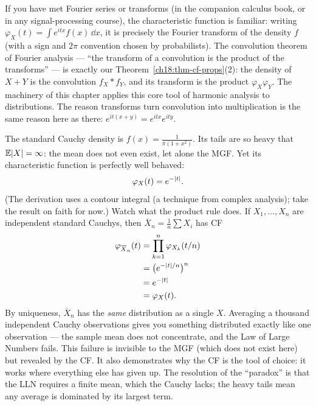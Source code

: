 \begin{connectionbox}
If you have met Fourier series or transforms (in the companion calculus book, or
in any signal-processing course), the characteristic function is familiar:
writing $\varphi_X(t)=\int e^{itx}f(x)\,\dd x$, it is precisely the
Fourier transform of the density $f$ (with a sign and $2\pi$ convention chosen
by probabilists). The convolution theorem of Fourier analysis --- ``the
transform of a convolution is the product of the transforms'' --- is exactly our
Theorem~\ref{ch18:thm-cf-props}(2): the density of $X+Y$ is the convolution
$f_X * f_Y$, and its transform is the product $\varphi_X\varphi_Y$. The
machinery of this chapter applies this core tool of
harmonic analysis to distributions. The reason transforms turn convolution into multiplication
is the same reason here as there: $e^{it(x+y)}=e^{itx}e^{ity}$.
\end{connectionbox}

\begin{paradoxbox}
\label{ch18:ex-cauchy}
The standard Cauchy density is $f(x)=\frac{1}{\pi(1+x^2)}$. Its tails are so
heavy that $\operatorname{\mathbb{E}}\lvert X\rvert=\infty$: the mean does not even exist, let alone the MGF.
Yet its characteristic function is perfectly well behaved:
\[
  \varphi_X(t) = e^{-\lvert t\rvert} .
\]
(The derivation uses a contour integral (a technique from complex analysis); take the result on faith for now.) Watch
what the product rule does. If $X_1,\dots,X_n$ are independent standard Cauchys,
then $\overline{X}_n=\frac1n\sum X_i$ has CF
\begin{align*}
  \varphi_{\overline X_n}(t)
   &= \prod_{k=1}^n \varphi_{X_k}(t/n) \\
   &= \big(e^{-\lvert t\rvert/n}\big)^n \\
   &= e^{-\lvert t\rvert} \\
   &= \varphi_X(t).
\end{align*}
By uniqueness, $\overline{X}_n$ has the \emph{same} distribution as a single
$X$. Averaging a thousand independent Cauchy observations gives you something
distributed exactly like one observation --- the sample mean does not
concentrate, and the Law of Large Numbers fails. This failure is invisible to the MGF (which does not exist here) but revealed by the CF. It also demonstrates why the CF is the tool of
choice: it works where everything else has given up. The resolution of the
``paradox'' is that the LLN requires a finite mean, which the Cauchy
lacks; the heavy tails mean any average is dominated by its largest term.
\end{paradoxbox}

